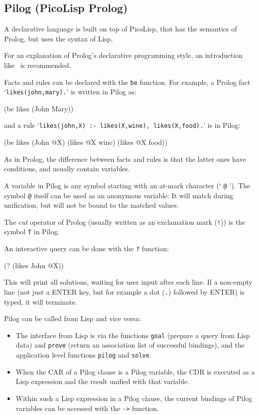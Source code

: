 \subsection{Pilog (PicoLisp Prolog)}
\label{sec:refm-pilog-(picolisp-prolog)}


A declarative language is built on top of PicoLisp, that has the
semantics of Prolog, but uses the syntax of Lisp.

For an explanation of Prolog's declarative programming style, an
introduction like~\cite{prolog1} is recommended.

Facts and rules can be declared with the \texttt{be} function. For example, a
Prolog fact `\texttt{likes(john,mary).}' is written in Pilog as:


\begin{wideverbatim}
(be likes (John Mary))
\end{wideverbatim}

and a rule `\texttt{likes(john,X) :- likes(X,wine), likes(X,food).}' is in
Pilog:


\begin{wideverbatim}
(be likes (John @X) (likes @X wine) (likes @X food))
\end{wideverbatim}

As in Prolog, the difference between facts and rules is that the latter
ones have conditions, and usually contain variables.

A variable in Pilog is any symbol starting with an at-mark character
(` \texttt{@} '). The symbol \texttt{@} itself can be used as an anonymous variable: It
will match during unification, but will not be bound to the matched
values.

The \emph{cut} operator of Prolog (usually written as an exclamation mark
(\texttt{!})) is the symbol \texttt{T} in Pilog.

An interactive query can be done with the \texttt{?} function:


\begin{wideverbatim}
(? (likes John @X))
\end{wideverbatim}

This will print all solutions, waiting for user input after each line.
If a non-empty line (not just a ENTER key, but for example a dot (\texttt{.})
followed by ENTER) is typed, it will terminate.

Pilog can be called from Lisp and vice versa:

\begin{itemize}
\item The interface from Lisp is via the functions \texttt{goal} (prepare a query
   from Lisp data) and \texttt{prove} (return an association list of successful
   bindings), and the application level functions \texttt{pilog} and \texttt{solve}.
\item When the CAR of a Pilog clause is a Pilog variable, the CDR is
   executed as a Lisp expression and the result unified with that
   variable.
\item Within such a Lisp expression in a Pilog clause, the current bindings
   of Pilog variables can be accessed with the \texttt{->} function.
\end{itemize}

